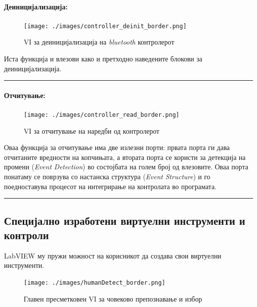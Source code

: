 \documentclass[11pt]{article}
\begin{document}
      \paragraph{Деиницијализација:\\}
        \begin{figure}[H]
          \centering
	        \texttt{[image: ./images/controller\_deinit\_border.png]}
		      \caption{VI за деиницијализација на \textit{bluetooth} контролерот}
	        \label{fig:controller_deinit.png}
	        \end{figure}
        Иста функција и влезови како и претходно наведените блокови за деиницијализација.\\
        \textcolor[RGB]{150,150,150}{\rule{\linewidth}{1.6pt}}

      \paragraph{Отчитување:\\}
        \begin{figure}[H]
          \centering
	        \texttt{[image: ./images/controller\_read\_border.png]}
		      \caption{VI за отчитување на наредби од контролерот}
	        \label{fig:controller_read.png}
	        \end{figure}
        Оваа функција за отчитување има две излезни порти: првата порта ги дава отчитаните вредности на копчињата, а втората порта се користи за детекција на промени (\textit{Event Detection}) во состојбата на голем број од влезовите. Оваа порта понатаму се поврзува со настанска структура (\textit{Event Structure}) и го поедноставува процесот на интегрирање на контролата во програмата.\\
        \textcolor[RGB]{150,150,150}{\rule{\linewidth}{1.6pt}}

  \subsection{Специјално изработени виртуелни инструменти и контроли}
    LabVIEW му пружи можност на корисникот да создава свои виртуелни инструменти.
    \label{sec:humanDetect}
	  \begin{figure}[H]
      \centering
	    \texttt{[image: ./images/humanDetect\_border.png]}
		  \caption{Главен пресметковен VI за човеково препознавање и избор}
	    \label{fig:humanDetect.png}
	    \end{figure}
\end{document}
